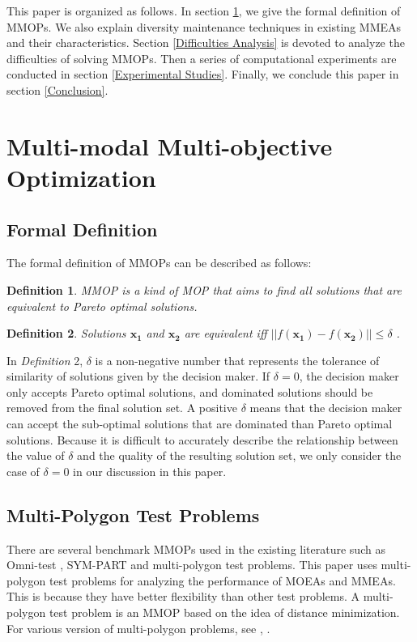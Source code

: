 \documentclass[conference]{IEEEtran}
\newtheorem{definition}{Definition}
\begin{document}
This paper is organized as follows. In section \ref{Multi-modal Multi-objective Optimization}, we give the formal definition of MMOPs. We also explain diversity maintenance techniques in existing MMEAs and their characteristics. Section \ref{Difficulties Analysis} is devoted to analyze the difficulties of solving MMOPs. Then a series of computational experiments are conducted in section \ref{Experimental Studies}. Finally, we conclude this paper in section \ref{Conclusion}.
\section{Multi-modal Multi-objective Optimization}
\label{Multi-modal Multi-objective Optimization}
\subsection{Formal Definition}
The formal definition of MMOPs can be described as follows\cite{tanabe2019review}:
\begin{definition}
MMOP is a kind of MOP that aims to find all solutions that are equivalent to Pareto optimal solutions. 
\end{definition}
\begin{definition}
Solutions $\boldsymbol{x_1}$ and  $\boldsymbol{x_2}$ are equivalent  iff $||f(\boldsymbol{x_1}) - f(\boldsymbol{x_2})|| \leq \delta$ .
\end{definition}

In \textit{Definition} 2, $\delta$ is a non-negative number that represents the tolerance of similarity of solutions given by the decision maker. If $\delta = 0$, the decision maker only accepts Pareto optimal solutions, and dominated solutions should be removed from the final solution set. A positive $\delta$ means that the decision maker can accept the sub-optimal solutions that are dominated than Pareto optimal solutions. Because it is difficult to accurately describe the relationship between the value of $\delta$ and the quality of the resulting solution set, we only consider the case of $\delta =0$ in our discussion in this paper. 

\subsection{Multi-Polygon Test Problems}
There are several benchmark MMOPs used in the existing literature such as Omni-test \cite{deb2005omni} , SYM-PART \cite{rudolph2007capabilities} and multi-polygon\cite{ishibuchi2019salable} test problems. This paper uses multi-polygon test problems for analyzing the performance of MOEAs and MMEAs. This is because they have better flexibility than other test problems. A multi-polygon test problem is an MMOP based on the idea of distance minimization. For various version of multi-polygon problems, see \cite{fieldsend2019feature}, \cite{nojima2019constrained}.
\end{document}
